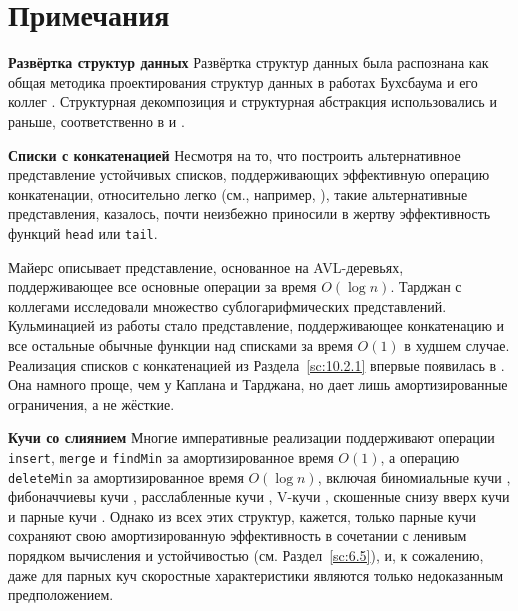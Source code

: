 \section{Примечания}
\label{sc:10.4}

\noindent
\textbf{Развёртка структур данных} Развёртка структур данных была
распознана как общая методика проектирования структур данных в
работах Бухсбаума и его коллег \cite{Buchsbaum1993,
  BuchsbaumTarjan1995, BuchsbaumSundarTarjan1995}. Структурная
декомпозиция и структурная абстракция использовались и раньше,
соответственно в \cite{Dietz1982} и \cite{DriscollSleatorTarjan1994}.

\noindent
\textbf{Списки с конкатенацией} Несмотря на то, что построить
альтернативное представление устойчивых списков, поддерживающих
эффективную операцию конкатенации, относительно легко (см., например,
\cite{Hughes 1986}), такие альтернативные представления, казалось,
почти неизбежно приносили в жертву эффективность функций
\lstinline!head! или \lstinline!tail!.

Майерс \cite{Myers1982} описывает представление, основанное на
AVL-деревьях, поддерживающее все основные операции за время $O(\log
n)$. Тарджан с коллегами \cite{DriscollSleatorTarjan194,
  BuchsbaumTarjan1995, KaplanTarjan1995} исследовали множество
сублогарифмических представлений. Кульминацией из работы стало
представление, поддерживающее конкатенацию и все остальные обычные
функции над списками за время $O(1)$ в худшем случае. Реализация
списков с конкатенацией из Раздела~\ref{sc:10.2.1} впервые появилась в
\cite{Okasaki1995a}. Она намного проще, чем у Каплана и Тарджана, но
дает лишь амортизированные ограничения, а не жёсткие.

\noindent
\textbf{Кучи со слиянием} Многие императивные реализации поддерживают
операции \lstinline!insert!, \lstinline!merge! и \lstinline!findMin!
за амортизированное время $O(1)$, а операцию \lstinline!deleteMin! за
амортизированное время $O(\log n)$, включая биномиальные кучи
\cite{KhoongLeong1993}, фибоначчиевы кучи \cite{FredmanTarjan1987},
расслабленные кучи \cite{Driscoll-etal1988}, V-кучи
\cite{Peterson1987}, скошенные снизу вверх кучи
\cite{SleatorTarjan1986b} и парные кучи
\cite{Fredman-etal1986}. Однако из всех этих структур, кажется, только
парные кучи сохраняют свою амортизированную эффективность в сочетании
с ленивым порядком вычисления и устойчивостью
(см. Раздел~\ref{sc:6.5}), и, к сожалению, даже для парных куч
скоростные характеристики являются только недоказанным предположением.

